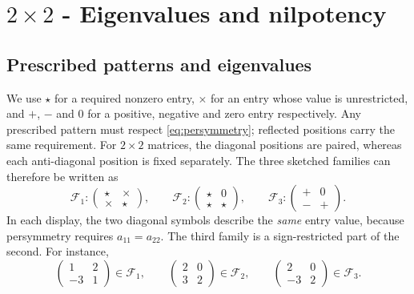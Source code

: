 \documentclass[11pt,a4paper]{article}
\begin{document}
\section{\texorpdfstring{$2\times2$}{2 by 2} - Eigenvalues and nilpotency}
\label{sec:dimension-two}

\subsection{Prescribed patterns and eigenvalues}

We use $\star$ for a required nonzero entry, $\times$ for an entry
whose value is unrestricted, and $+$, $-$ and $0$ for a positive, negative and
zero entry respectively. Any prescribed pattern must respect
\eqref{eq:persymmetry}; reflected positions carry the same requirement.
For $2\times2$ matrices, the diagonal positions are paired, whereas each
anti-diagonal position is fixed separately. The three sketched families can
therefore be written as
\[
 \mathcal F_1:\begin{pmatrix}\star&\times\\\times&\star\end{pmatrix},
 \qquad
 \mathcal F_2:\begin{pmatrix}\star&0\\\star&\star\end{pmatrix},
 \qquad
 \mathcal F_3:\begin{pmatrix}+&0\\-&+\end{pmatrix}.
\]
In each display, the two diagonal symbols describe the \emph{same} entry
value, because persymmetry requires $a_{11}=a_{22}$. The third family is a
sign-restricted part of the second. For instance,
\[
 \begin{pmatrix}1&2\\-3&1\end{pmatrix}\in\mathcal F_1,
 \qquad
 \begin{pmatrix}2&0\\3&2\end{pmatrix}\in\mathcal F_2,
 \qquad
 \begin{pmatrix}2&0\\-3&2\end{pmatrix}\in\mathcal F_3.
\]
\end{document}
